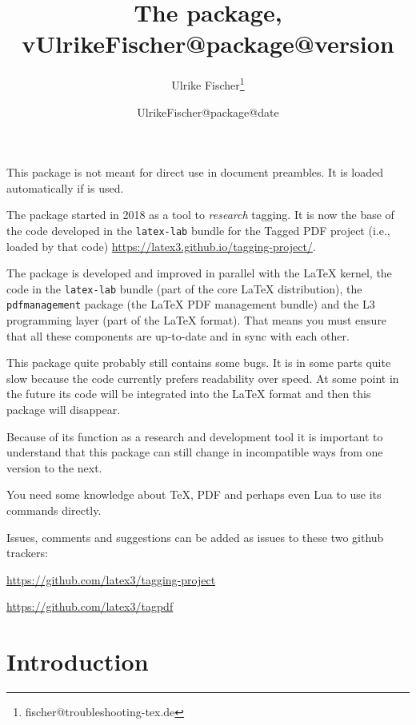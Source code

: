 \documentclass[bibliography=totoc,a4paper]{article}
\title{The \pkg{tagpdf} package, v\csname UlrikeFischer@package@version\endcsname}
\date{\csname UlrikeFischer@package@date\endcsname}
\author{Ulrike Fischer\thanks{fischer@troubleshooting-tex.de}}
\newcommand\pkg[1]{\texttt{#1}}
\newcommand\PDF{PDF}
\begin{document}
\maketitle

\begin{tcolorbox}[colframe=red]

This package is not meant for direct use in document preambles. It is loaded automatically 
if  is used. 

The package started in 2018 as a tool to \emph{research} tagging. It is now the base of the code developed 
in the \pkg{latex-lab} bundle for the Tagged PDF project (i.e., loaded by that code)
\url{https://latex3.github.io/tagging-project/}. 

The package is developed and improved in parallel with the \LaTeX{} kernel, the code in 
the \pkg{latex-lab} bundle (part of the core \LaTeX{} distribution),  the \pkg{pdfmanagement} 
package (the \LaTeX{} PDF management bundle) and the L3 programming layer (part of the \LaTeX{} format). 
That means you must ensure that all these components are up-to-date and in 
sync with each other. 

This package quite probably still contains some bugs. It is in some parts quite slow because
the code currently prefers readability over speed. At some point in the future its code will 
be integrated into the \LaTeX{} format and then this package will disappear. 

Because of its function as a research and development tool it is
important to understand that this package can still change in
incompatible ways from one version to the next.

You need some knowledge about \TeX, \PDF{} and perhaps even Lua to use its commands
directly.

\medskip

Issues, comments and suggestions can be added as issues to these two github trackers:

\medskip
\centering \url{https://github.com/latex3/tagging-project}\par 
\leavevmode{} \url{https://github.com/latex3/tagpdf} 

\end{tcolorbox}



\tableofcontents



\section{Introduction}
\end{document}
